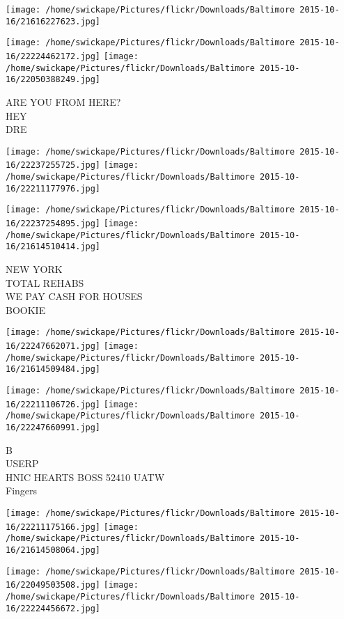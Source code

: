\documentclass[10pt,letterpaper]{article}
\begin{document}
\texttt{[image: /home/swickape/Pictures/flickr/Downloads/Baltimore 2015-10-16/21616227623.jpg]}

\vspace{0.25in}
\texttt{[image: /home/swickape/Pictures/flickr/Downloads/Baltimore 2015-10-16/22224462172.jpg]}
\texttt{[image: /home/swickape/Pictures/flickr/Downloads/Baltimore 2015-10-16/22050388249.jpg]}

ARE YOU FROM HERE?\\
HEY\\
DRE\\
\pagebreak

\texttt{[image: /home/swickape/Pictures/flickr/Downloads/Baltimore 2015-10-16/22237255725.jpg]}
\texttt{[image: /home/swickape/Pictures/flickr/Downloads/Baltimore 2015-10-16/22211177976.jpg]}

\texttt{[image: /home/swickape/Pictures/flickr/Downloads/Baltimore 2015-10-16/22237254895.jpg]}
\texttt{[image: /home/swickape/Pictures/flickr/Downloads/Baltimore 2015-10-16/21614510414.jpg]}

NEW YORK\\
TOTAL REHABS\\
WE PAY CASH FOR HOUSES\\
BOOKIE\\
\pagebreak

\texttt{[image: /home/swickape/Pictures/flickr/Downloads/Baltimore 2015-10-16/22247662071.jpg]}
\texttt{[image: /home/swickape/Pictures/flickr/Downloads/Baltimore 2015-10-16/21614509484.jpg]}

\texttt{[image: /home/swickape/Pictures/flickr/Downloads/Baltimore 2015-10-16/22211106726.jpg]}
\texttt{[image: /home/swickape/Pictures/flickr/Downloads/Baltimore 2015-10-16/22247660991.jpg]}

B\\
USERP\\
HNIC HEARTS BOSS 52410 UATW\\
Fingers\\
\pagebreak

\texttt{[image: /home/swickape/Pictures/flickr/Downloads/Baltimore 2015-10-16/22211175166.jpg]}
\texttt{[image: /home/swickape/Pictures/flickr/Downloads/Baltimore 2015-10-16/21614508064.jpg]}

\texttt{[image: /home/swickape/Pictures/flickr/Downloads/Baltimore 2015-10-16/22049503508.jpg]}
\texttt{[image: /home/swickape/Pictures/flickr/Downloads/Baltimore 2015-10-16/22224456672.jpg]}
\end{document}
